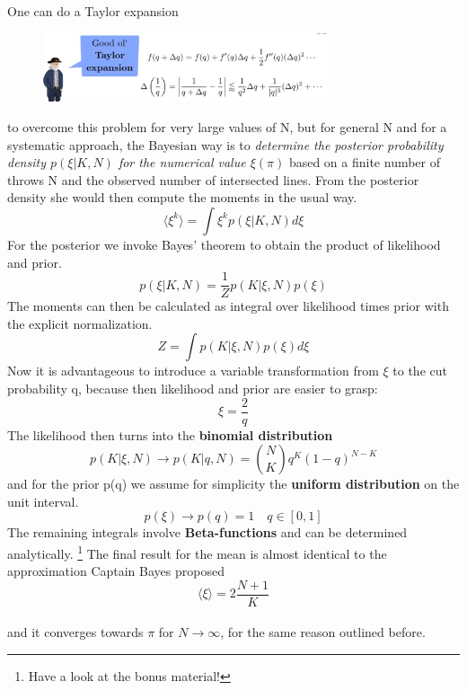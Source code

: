 \documentclass[12pt, a4paper]{scrartcl}
\begin{document}
One can do a Taylor expansion%
 \begin{figure}[H]
	\centering
	\includegraphics[width=0.75\textwidth]{9_3.png}
\end{figure}
 to
overcome this problem for very large values of N, but for general N and
for a systematic approach, the Bayesian way is to \textit{determine the posterior
probability density $p(\xi|K,N)$ for the numerical value $\xi(\pi)$} based on a
ﬁnite number of throws N and the observed number of intersected lines.
From the posterior density she would then compute the
moments in the usual way.
\[\langle \xi^k\rangle = \int \xi^kp(\xi|K,N)d\xi\]
For the posterior we invoke Bayes’ theorem to obtain the product of likelihood
and prior.
\[p(\xi|K,N)=\frac 1Z p(K|\xi,N)p(\xi)\]
The moments can then be calculated as integral over likelihood times prior
with the explicit normalization.
\[Z=\int p(K|\xi,N)p(\xi)d\xi\]
Now it is advantageous to introduce a variable transformation from $\xi$ to the
cut probability q, because then likelihood and prior are
easier to grasp:
\[\xi=\frac 2q\]
The likelihood then turns into  the  \textbf{binomial distribution}
\[p(K|\xi,N)\rightarrow p(K|q,N)={N\choose K} q^K(1-q)^{N-K}\]
and for the prior p(q) we assume for simplicity the  \textbf{uniform distribution} on
the unit interval. \[p(\xi)\rightarrow p(q)=1 \quad q\in[0,1]\]
The remaining integrals involve  \textbf{Beta-functions} and can be
determined analytically. \footnote{Have a look at the bonus material!} The ﬁnal result for the mean is almost identical to
the approximation Captain Bayes proposed 
\begin{equation*}\boxed{\langle \xi\rangle = 2\frac{N+1}{K}
}\end{equation*}\\
and it converges towards $\pi$ for $N\rightarrow \infty$, for the same reason outlined before.\\
\end{document}
